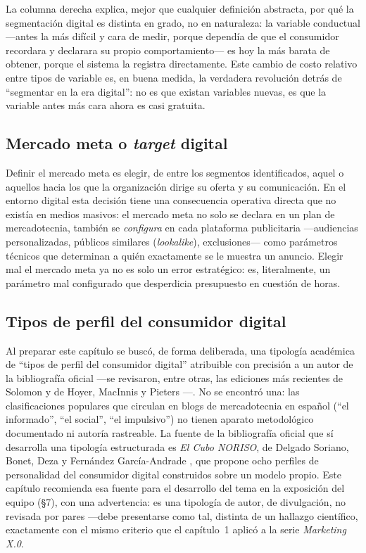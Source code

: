 La columna derecha explica, mejor que cualquier definición abstracta, por
qué la segmentación digital es distinta en grado, no en naturaleza: la
variable conductual —antes la más difícil y cara de medir, porque dependía
de que el consumidor recordara y declarara su propio comportamiento— es hoy
la más barata de obtener, porque el sistema la registra directamente. Este
cambio de costo relativo entre tipos de variable es, en buena medida, la
verdadera revolución detrás de \enquote{segmentar en la era digital}: no es que
existan variables nuevas, es que la variable antes más cara ahora es casi
gratuita.

\subsection{Mercado meta o \textit{target} digital}

Definir el mercado meta es elegir, de entre los segmentos identificados,
aquel o aquellos hacia los que la organización dirige su oferta y su
comunicación. En el entorno digital esta decisión tiene una consecuencia
operativa directa que no existía en medios masivos: el mercado meta no solo
se declara en un plan de mercadotecnia, también se \textit{configura} en
cada plataforma publicitaria —audiencias personalizadas, públicos similares
(\textit{lookalike}), exclusiones— como parámetros técnicos que determinan a
quién exactamente se le muestra un anuncio. Elegir mal el mercado meta ya no
es solo un error estratégico: es, literalmente, un parámetro mal configurado
que desperdicia presupuesto en cuestión de horas.

\subsection{Tipos de perfil del consumidor digital}

Al preparar este capítulo se buscó, de forma deliberada, una tipología
académica de \enquote{tipos de perfil del consumidor digital} atribuible con
precisión a un autor de la bibliografía oficial —se revisaron, entre otras,
las ediciones más recientes de Solomon \parencite{solomon2023consumer} y de
Hoyer, MacInnis y Pieters \parencite{hoyer2024consumer}—. No se encontró una:
las clasificaciones populares que circulan en blogs de mercadotecnia en
español
(\enquote{el informado}, \enquote{el social}, \enquote{el impulsivo}) no tienen
aparato metodológico documentado ni autoría rastreable. La fuente de la
bibliografía oficial que sí desarrolla una tipología estructurada es
\textit{El Cubo NORISO}, de Delgado Soriano, Bonet, Deza y Fernández
García-Andrade \parencite{delgado2015noriso}, que propone ocho perfiles de
personalidad del consumidor digital construidos sobre un modelo propio. Este
capítulo recomienda esa fuente para el desarrollo del tema en la exposición
del equipo (§7), con una advertencia: es una tipología de autor, de
divulgación, no revisada por pares —debe presentarse como tal, distinta de
un hallazgo científico, exactamente con el mismo criterio que el capítulo~1
aplicó a la serie \textit{Marketing X.0}.

